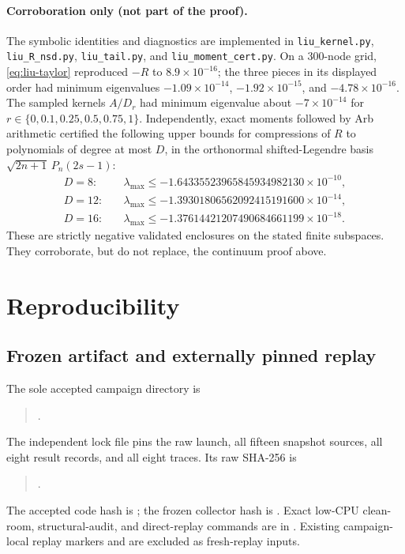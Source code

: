 \documentclass[11pt]{article}
\theoremstyle{plain}
\theoremstyle{definition}
\theoremstyle{remark}
\begin{document}
\paragraph{Corroboration only (not part of the proof).}
The symbolic identities and diagnostics are implemented in
\texttt{liu\_kernel.py}, \texttt{liu\_R\_nsd.py}, \texttt{liu\_tail.py}, and
\texttt{liu\_moment\_cert.py}.  On a $300$-node grid,
\eqref{eq:liu-taylor} reproduced $-R$ to $8.9\times10^{-16}$; the three pieces
in its displayed order had minimum eigenvalues
$-1.09\times10^{-14}$, $-1.92\times10^{-15}$, and
$-4.78\times10^{-16}$.  The sampled kernels $A/D_r$ had minimum eigenvalue
about $-7\times10^{-14}$ for
$r\in\{0,0.1,0.25,0.5,0.75,1\}$.  Independently, exact moments followed by
Arb arithmetic certified the following upper bounds for compressions of $R$
to polynomials of degree at most $D$, in the orthonormal shifted-Legendre basis
$\sqrt{2n+1}\,P_n(2s-1)$:
\[
\begin{aligned}
D=8:\quad
&\lambda_{\max}\le-1.64335523965845934982130\times10^{-10},\\
D=12:\quad
&\lambda_{\max}\le-1.39301806562092415191600\times10^{-14},\\
D=16:\quad
&\lambda_{\max}\le-1.37614421207490684661199\times10^{-18}.
\end{aligned}
\]
These are strictly negative validated enclosures on the stated finite
subspaces.  They corroborate, but do not replace, the continuum proof above.

\appendix
\section{Reproducibility}
\label{sec:verify}

\subsection{Frozen artifact and externally pinned replay}
The sole accepted campaign directory is
\begin{quote}\small
{}.
\end{quote}
The independent lock file  pins the
raw launch, all fifteen snapshot sources, all eight result records, and all
eight traces.  Its raw SHA-256 is
\begin{quote}\small
{}.
\end{quote}
The accepted code hash is
;
the frozen collector hash is
.
Exact low-CPU clean-room, structural-audit, and direct-replay commands are in
.  Existing campaign-local replay markers and
 are excluded as fresh-replay inputs.
\end{document}

